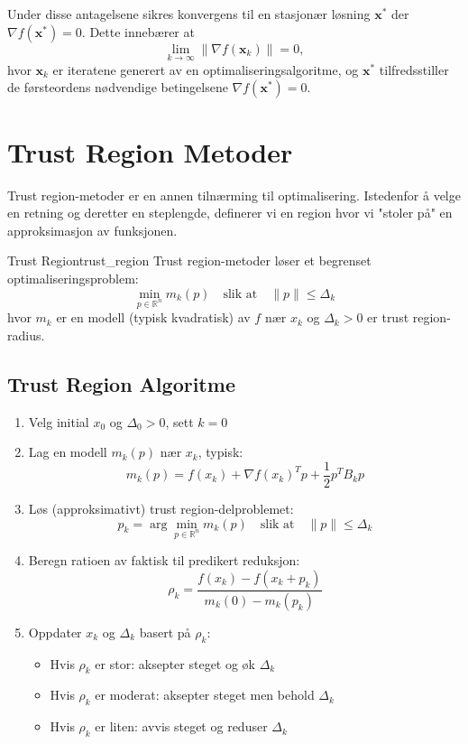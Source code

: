 Under disse antagelsene sikres konvergens til en stasjonær løsning \(\symbf{x}^*\) der
\(\nabla f(\symbf{x}^*) = 0\).
Dette innebærer at
\[
  \lim_{k \to \infty} \|\nabla f(\symbf{x}_k)\| = 0,
\]
hvor \(\symbf{x}_k\) er iteratene generert av en optimaliseringsalgoritme, og \(\symbf{x}^*\) tilfredsstiller de førsteordens nødvendige betingelsene \(\nabla f(\symbf{x}^*) = 0\).

\section{Trust Region Metoder}

Trust region-metoder er en annen tilnærming til optimalisering. Istedenfor å velge en retning og deretter en steplengde, definerer vi en region hvor vi "stoler på" en approksimasjon av funksjonen.

\begin{definition}{Trust Region}{trust_region}
  Trust region-metoder løser et begrenset optimaliseringsproblem:
  \[
    \min_{p \in \mathbb{R}^n} m_k(p) \quad \text{slik at} \quad \|p\| \leq \Delta_k
  \]
  hvor $m_k$ er en modell (typisk kvadratisk) av $f$ nær $x_k$ og $\Delta_k > 0$ er trust region-radius.
\end{definition}

\subsection{Trust Region Algoritme}

\begin{enumerate}
  \item Velg initial $x_0$ og $\Delta_0 > 0$, sett $k = 0$
  \item Lag en modell $m_k(p)$ nær $x_k$, typisk:
        \[
          m_k(p) = f(x_k) + \nabla f(x_k)^T p + \frac{1}{2}p^T B_k p
        \]
  \item Løs (approksimativt) trust region-delproblemet:
        \[
          p_k = \arg\min_{p \in \mathbb{R}^n} m_k(p) \quad \text{slik at} \quad \|p\| \leq \Delta_k
        \]
  \item Beregn ratioen av faktisk til predikert reduksjon:
        \[
          \rho_k = \frac{f(x_k) - f(x_k + p_k)}{m_k(0) - m_k(p_k)}
        \]
  \item Oppdater $x_k$ og $\Delta_k$ basert på $\rho_k$:
        \begin{itemize}
          \item Hvis $\rho_k$ er stor: aksepter steget og øk $\Delta_k$
          \item Hvis $\rho_k$ er moderat: aksepter steget men behold $\Delta_k$
          \item Hvis $\rho_k$ er liten: avvis steget og reduser $\Delta_k$
        \end{itemize}
\end{enumerate}

